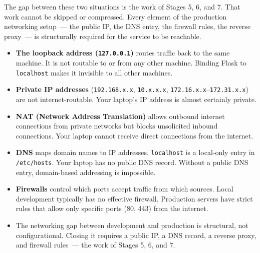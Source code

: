 \noindent{}The gap between these two situations is the work of Stages 5, 6, and 7. That work cannot be skipped or compressed. Every element of the production networking setup~--- the public IP, the DNS entry, the firewall rules, the reverse proxy~--- is structurally required for the service to be reachable.

\label{10-networking-limitations:key-takeaways}
\begin{takeaways}

\begin{itemize}
\tightlist
\item
  \textbf{The loopback address (\texttt{127.0.0.1})} routes traffic back to the same machine. It is not routable to or from any other machine. Binding Flask to \texttt{localhost} makes it invisible to all other machines.
\item
  \textbf{Private IP addresses} (\texttt{192.168.x.x}, \texttt{10.x.x.x}, \texttt{172.16.x.x}--\texttt{172.31.x.x}) are not internet-routable. Your laptop's IP address is almost certainly private.
\item
  \textbf{NAT (Network Address Translation)} allows outbound internet connections from private networks but blocks unsolicited inbound connections. Your laptop cannot receive direct connections from the internet.
\item
  \textbf{DNS} maps domain names to IP addresses. \texttt{localhost} is a local-only entry in \texttt{/etc/hosts}. Your laptop has no public DNS record. Without a public DNS entry, domain-based addressing is impossible.
\item
  \textbf{Firewalls} control which ports accept traffic from which sources. Local development typically has no effective firewall. Production servers have strict rules that allow only specific ports (80, 443) from the internet.
\item
  The networking gap between development and production is structural, not configurational. Closing it requires a public IP, a DNS record, a reverse proxy, and firewall rules~--- the work of Stages 5, 6, and 7.
\end{itemize}

\end{takeaways}

\label{10-networking-limitations:exercises}

